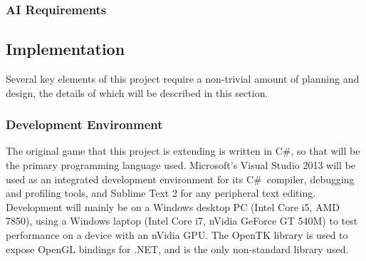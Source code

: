 \documentclass[12pt,a4paper]{article}
\newcommand{\Csh}{C{\lserif\#}}
\begin{document}
\subsubsection{AI Requirements}
\begin{requirements}





\end{requirements}

\subsection{Implementation}\noindent
Several key elements of this project require a non-trivial amount of planning and design, the details of which will be described in this section.

\subsubsection{Development Environment}\noindent
The original game that this project is extending is written in \Csh, so that will be the primary programming language used. Microsoft's Visual Studio 2013 will be used as an integrated development environment for its \Csh~compiler, debugging and profiling tools, and Sublime Text 2 for any peripheral text editing. Development will mainly be on a Windows desktop PC (Intel Core i5, AMD 7850), using a Windows laptop (Intel Core i7, nVidia GeForce GT 540M) to test performance on a device with an nVidia GPU. The OpenTK library is used to expose OpenGL bindings for .NET, and is the only non-standard library used.
\end{document}
